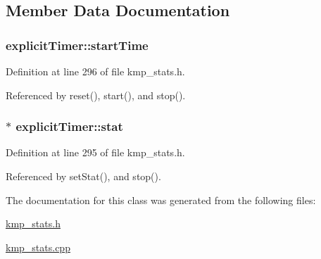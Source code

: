 \subsection{Member Data Documentation}
\hypertarget{classexplicitTimer_ad457d205b0b6d5309f65514e438992d2}{
\subsubsection[{start\-Time}]{ explicit\-Timer\-::start\-Time\hspace{0.3cm}{\ttfamily [private]}}}\label{classexplicitTimer_ad457d205b0b6d5309f65514e438992d2}


Definition at line 296 of file kmp\-\_\-stats.\-h.



Referenced by reset(), start(), and stop().

\hypertarget{classexplicitTimer_afba814013964a74c3142ffde95f8ba1f}{
\subsubsection[{stat}]{$\ast$ explicit\-Timer\-::stat\hspace{0.3cm}{\ttfamily [private]}}}\label{classexplicitTimer_afba814013964a74c3142ffde95f8ba1f}


Definition at line 295 of file kmp\-\_\-stats.\-h.



Referenced by set\-Stat(), and stop().



The documentation for this class was generated from the following files\-:\begin{DoxyCompactItemize}
\item 
\hyperlink{kmp__stats_8h}{kmp\-\_\-stats.\-h}\item 
\hyperlink{kmp__stats_8cpp}{kmp\-\_\-stats.\-cpp}\end{DoxyCompactItemize}
